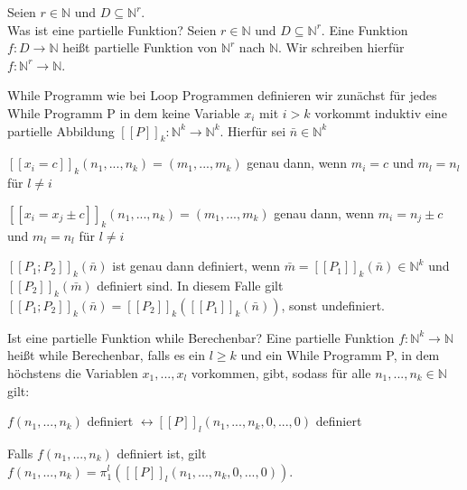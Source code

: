 \documentclass[avery5371, frame]{flashcards}
\begin{document}
\begin{flashcard}[Definition]{Seien $r\in\mathbb{N}$ und $D\subseteq\mathbb{N}^r$.\\ Was ist eine partielle Funktion?}
    Seien $r\in\mathbb{N}$ und $D\subseteq\mathbb{N}^r$. Eine Funktion $f:D\rightarrow\mathbb{N}$ heißt partielle Funktion von $\mathbb{N}^r$ nach $\mathbb{N}$. Wir schreiben hierfür $f:\mathbb{N}^r \rightarrow\mathbb{N}$.
\end{flashcard}

\begin{flashcard}[Definition]{While Programm}
    wie bei Loop Programmen definieren wir zunächst für jedes While Programm P in dem keine Variable $x_i$ mit $i>k$ vorkommt induktiv eine partielle Abbildung $[[P]]_k:\mathbb{N}^k \rightarrow\mathbb{N}^k$. Hierfür sei $\bar{n}\in\mathbb{N}^k$
    \scriptsize{
        \begin{itemize*}
            \item $[[x_i=c]]_k(n_1,...,n_k)=(m_1,...,m_k)$ genau dann, wenn $m_i=c$ und $m_l=n_l$ für $l\not = i$
            \item $[[x_i=x_j \pm c]]_k(n_1,...,n_k)=(m_1,...,m_k)$ genau dann, wenn $m_i=n_j\pm c$ und $m_l=n_l$ für $l\not = i$
            \item $[[P_1; P_2]]_k(\bar{n})$ ist genau dann definiert, wenn $\bar{m}=[[P_1]]_k(\bar{n})\in\mathbb{N}^k$ und $[[P_2]]_k(\bar{m})$ definiert sind. In diesem Falle gilt $[[P_1; P_2]]_k(\bar{n})=[[P_2]]_k([[P_1]]_k(\bar{n}))$, sonst undefiniert.
        \end{itemize*}
    }
\end{flashcard}

\begin{flashcard}[Definition]{Ist eine partielle Funktion while Berechenbar?}
    Eine partielle Funktion $f:\mathbb{N}^k\rightarrow\mathbb{N}$ heißt while Berechenbar, falls es ein $l\geq k$ und ein While Programm P, in dem höchstens die Variablen $x_1,...,x_l$ vorkommen, gibt, sodass für alle $n_1,...,n_k\in\mathbb{N}$ gilt:\begin{itemize*}
        \item $f(n_1,...,n_k)$ definiert $\leftrightarrow [[P]]_l(n_1,...,n_k,0,...,0)$ definiert
        \item Falls $f(n_1,...,n_k)$ definiert ist, gilt $f(n_1,...,n_k)=\pi_1^l ([[P]]_l(n_1,...,n_k,0,...,0))$.
    \end{itemize*}
\end{flashcard}
\end{document}
